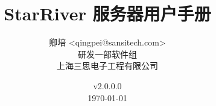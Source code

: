 \title{\textbf{StarRiver 服务器用户手册}}

\author{卿培 <qingpei@sansitech.com> \\
        研发一部软件组\\
        上海三思电子工程有限公司
}

\date{\vspace{3em} v2.0.0.0 \\\vspace{3em} \today}
